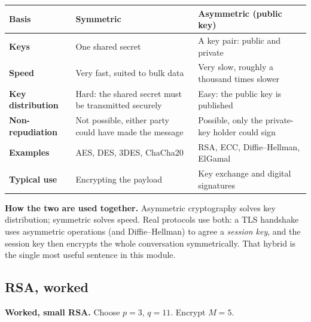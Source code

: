 \documentclass[11pt,a4paper]{article}
\begin{document}
\begin{center}\small
\begin{tabularx}{\textwidth}{>{\bfseries}p{} X X}
\toprule Basis & Symmetric & Asymmetric (public key)\\
\midrule
Keys & One shared secret & A key pair: public and private\\
Speed & Very fast, suited to bulk data & Very slow, roughly a thousand times slower\\
Key distribution & Hard: the shared secret must be transmitted securely & Easy: the public key is published\\
Non-repudiation & Not possible, either party could have made the message & Possible, only the private-key holder could sign\\
Examples & AES, DES, 3DES, ChaCha20 & RSA, ECC, Diffie--Hellman, ElGamal\\
Typical use & Encrypting the payload & Key exchange and digital signatures\\
\bottomrule
\end{tabularx}
\end{center}

\begin{rememberbox}
\textbf{How the two are used together.} Asymmetric cryptography solves key distribution; symmetric solves speed. Real protocols use both: a TLS handshake uses asymmetric operations (and Diffie--Hellman) to agree a \emph{session key}, and the session key then encrypts the whole conversation symmetrically. That hybrid is the single most useful sentence in this module.
\end{rememberbox}

\subsection{RSA, worked}

\begin{exambox}
\textbf{Worked, small RSA.} Choose $p = 3$, $q = 11$. Encrypt $M = 5$.
\end{exambox}
\end{document}
